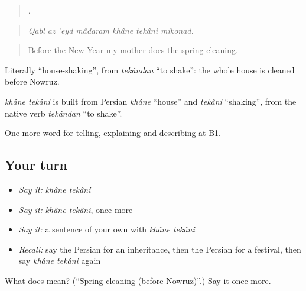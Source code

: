 \begin{quote}
      .
\end{quote}

\begin{quote}
\emph{Qabl az 'eyd mâdaram khâne tekâni mikonad.}
\end{quote}

\begin{quote}
Before the New Year my mother does the spring cleaning.
\end{quote}

Literally \textquotedblleft{}house-shaking\textquotedblright{}, from \emph{tekândan} \textquotedblleft{}to shake\textquotedblright{}: the whole house is cleaned before Nowruz.

\begin{cousinweb}
\emph{khâne tekâni} is built from Persian \emph{khâne} \textquotedblleft{}house\textquotedblright{} and \emph{tekâni} \textquotedblleft{}shaking\textquotedblright{}, from the native verb \emph{tekândan} \textquotedblleft{}to shake\textquotedblright{}.
\end{cousinweb}

\begin{grammarlens}[title={What you've built}]
One more word for telling, explaining and describing at B1.
\end{grammarlens}

\subsection*{Your turn}
\begin{itemize}
\raggedright
  \item \emph{Say it:} \emph{khâne tekâni}
  \item \emph{Say it:} \emph{khâne tekâni}, once more
  \item \emph{Say it:} a sentence of your own with \emph{khâne tekâni}
  \item \emph{Recall:} say the Persian for an inheritance, then the Persian for a festival, then say \emph{khâne tekâni} again
\end{itemize}

\begin{tcolorbox}[breakable,colback=teal!4,colframe=teal!35!black,title={Before you move on}]
What does   mean? (\textquotedblleft{}Spring cleaning (before Nowruz)\textquotedblright{}.) Say it once more.
\end{tcolorbox}
